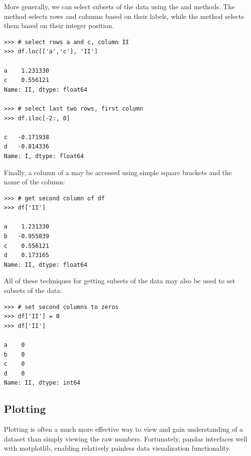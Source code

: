 More generally, we can select subsets of the data using the  and  methods.
The  method selects rows and columns based on their labels, while the  method
selects them based on their integer position.
\begin{lstlisting}
>>> # select rows a and c, column II
>>> df.loc[['a','c'], 'II']

a    1.231330
c    0.556121
Name: II, dtype: float64

>>> # select last two rows, first column
>>> df.iloc[-2:, 0]

c   -0.171938
d   -0.814336
Name: I, dtype: float64
\end{lstlisting}
Finally, a column of a  may be accessed using simple square brackets and the name of the column:
\begin{lstlisting}
>>> # get second column of df
>>> df['II']

a    1.231330
b   -0.955039
c    0.556121
d    0.173165
Name: II, dtype: float64
\end{lstlisting}

All of these techniques for getting subsets of the data may also be used to set subsets of the data:
\begin{lstlisting}
>>> # set second columns to zeros
>>> df['II'] = 0
>>> df['II']

a    0
b    0
c    0
d    0
Name: II, dtype: int64
\end{lstlisting}

\subsection*{Plotting}
Plotting is often a much more effective way to view and gain understanding of a dataset than simply
viewing the raw numbers. Fortunately, pandas interfaces well with matplotlib, enabling relatively
painless data visualization functionality.

